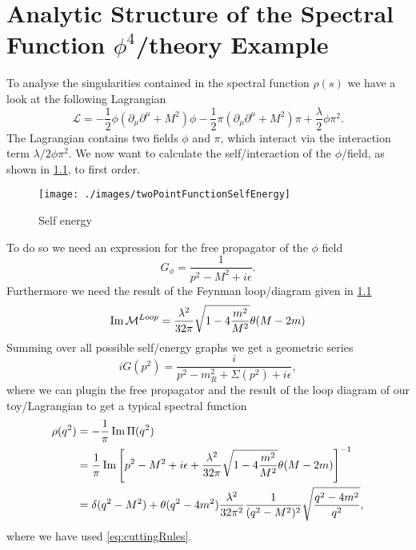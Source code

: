 \documentclass[../../index.tex]{subfiles}
\begin{document}
\chapter{Analytic Structure of the Spectral Function \(\phi^4\)\-/theory Example}
To analyse the singularities contained in the spectral function $\rho(s)$ we
have a look at the following Lagrangian
\begin{equation}
  \mathcal{L} = -\frac{1}{2} \phi(\partial_\mu \partial^\mu + M^2) \phi - \frac{1}{2}\pi(\partial_\mu\partial^\mu + M^2)\pi + \frac{\lambda}{2}{\phi\pi^2}.
\end{equation}
The Lagrangian contains two fields $\phi$ and $\pi$, which interact via the
interaction term $\lambda/2 \phi \pi^2$. We now want to calculate the
self\-/interaction of the $\phi$\-/field, as shown in
\cref{fig:twoPointFunctionSelfEnergy}, to first order.
\begin{figure}
  \centering
  \texttt{[image: ./images/twoPointFunctionSelfEnergy]}
  \caption{Self energy}
  \label{fig:twoPointFunctionSelfEnergy}
\end{figure}
To do so we need an expression for the free propagator of the $\phi$ field
\begin{equation}
  G_\phi = \frac{1}{p^2-M^2+i\epsilon}.
\end{equation}
Furthermore we need the result of the Feynman loop\-/diagram given in
\cref{fig:twoPointFunctionSelfEnergy}
\begin{equation}
  \operatorname{Im} \mathcal{M}^{Loop} = \frac{\lambda^2}{32 \pi} \sqrt{1 - 4\frac{m^2}{M^2}} \theta(M - 2m)
\end{equation}
Summing over all possible self\-/energy graphs we get a geometric series
\begin{equation}
  i G(p^2) = \frac{i}{p^2 - m_R^2 + \Sigma(p^2) + i\epsilon },
\end{equation}
where we can plugin the free propagator and the result of the loop diagram of
our toy\-/Lagrangian to get a typical spectral function
\begin{equation}
  \begin{split}
    \rho(q^2) &= -\frac{1}{\pi} \operatorname{Im} \Pi(q^2) \\
    &= \frac{1}{\pi} \operatorname{Im} \left[ p^2 - M^2 + i\epsilon + \frac{\lambda^2}{32 \pi} \sqrt{1 - 4\frac{m^2}{M^2}} \theta(M - 2m) \right]^{-1} \\
    &= \delta(q^2 - M^2) + \theta(q^2 - 4m^2)\frac{\lambda^2}{32 \pi^2}
    \frac{1}{(q^2 - M^2)^2} \sqrt{\frac{q^2 - 4m^2}{q^2}},
  \end{split}
\end{equation}
where we have used \cref{eq:cuttingRules}.

  
\end{document}
